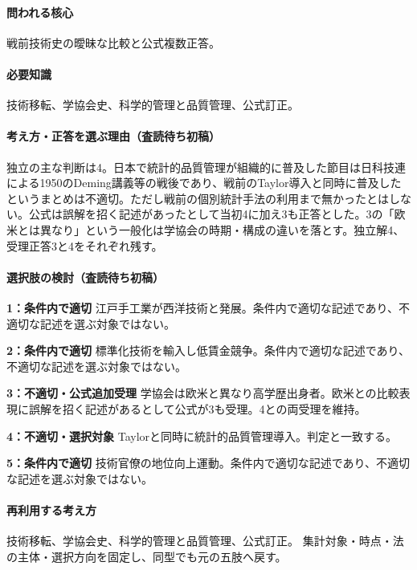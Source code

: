 \paragraph{問われる核心} 戦前技術史の曖昧な比較と公式複数正答。

\paragraph{必要知識} 技術移転、学協会史、科学的管理と品質管理、公式訂正。

\paragraph{考え方・正答を選ぶ理由（査読待ち初稿）} 独立の主な判断は4。日本で統計的品質管理が組織的に普及した節目は日科技連による1950のDeming講義等の戦後であり、戦前のTaylor導入と同時に普及したというまとめは不適切。ただし戦前の個別統計手法の利用まで無かったとはしない。公式は誤解を招く記述があったとして当初4に加え3も正答とした。3の「欧米とは異なり」という一般化は学協会の時期・構成の違いを落とす。独立解4、受理正答3と4をそれぞれ残す。

\paragraph{選択肢の検討（査読待ち初稿）}\mbox{}\par

\noindent\textbf{1：条件内で適切} 江戸手工業が西洋技術と発展。条件内で適切な記述であり、不適切な記述を選ぶ対象ではない。\par

\noindent\textbf{2：条件内で適切} 標準化技術を輸入し低賃金競争。条件内で適切な記述であり、不適切な記述を選ぶ対象ではない。\par

\noindent\textbf{3：不適切・公式追加受理} 学協会は欧米と異なり高学歴出身者。欧米との比較表現に誤解を招く記述があるとして公式が3も受理。4との両受理を維持。\par

\noindent\textbf{4：不適切・選択対象} Taylorと同時に統計的品質管理導入。判定と一致する。\par

\noindent\textbf{5：条件内で適切} 技術官僚の地位向上運動。条件内で適切な記述であり、不適切な記述を選ぶ対象ではない。\par

\paragraph{再利用する考え方} 技術移転、学協会史、科学的管理と品質管理、公式訂正。 集計対象・時点・法の主体・選択方向を固定し、同型でも元の五肢へ戻す。

